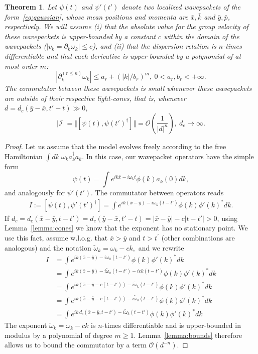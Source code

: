 \documentclass[notitlepage, prx, preprint, amsmath,superscriptaddress,amssymb]{revtex4-1}
\newtheorem{theorem}{Theorem}[section]
\begin{document}
\begin{theorem}
\label{th:free-causality}
Let $\psi(t)$ and $\psi'(t')$ denote two localized wavepackets of the form\ \eqref{eq:gaussian}, whose mean positions and momenta are $\bar x,\bar k$ and $\bar y,\bar p$, respectively. We will assume (i) that the  absolute value for the group velocity of these wavepackets is upper-bounded by a constant $c$ within the domain of the wavepackets ($\vert  v_k = \partial_k \omega_k \vert  \leq c$), and (ii) that the dispersion relation is $n$-times differentiable and that each derivative is upper-bounded by a polynomial of at most order $m$:
\begin{equation}
|\partial^{(r\leq n)}_k\omega_k|\leq a_r + (|k|/b_r)^m,~0< a_r,b_r<+\infty.
\end{equation}
The commutator between these wavepackets is small whenever these wavepackets are outside of their respective light-cones, that is, whenever $d=d_c(\bar y-\bar x,t'-t)\gg 0$, 
\begin{equation}
|\mathcal{I}|=\Vert[\psi(t),\psi(t')^\dagger]\Vert =
\mathcal{O}\left(\frac{1}{|d|^n}\right),~d_c\to\infty.
\end{equation}
\end{theorem}

\begin{proof}
Let us assume that the model evolves freely according to the free Hamiltonian
$\int d k \; \omega_k a_k^\dagger a_k$.
In this case, our wavepacket operators have the simple form
\begin{equation}
\psi(t) = \int  e^{ik\bar x-i\omega_kt} \phi(k) a_k(0) dk,
\end{equation}
and analogously for $\psi'(t')$. The commutator between operators reads
\begin{align}
I:=[\psi(t),\psi'(t')^\dagger] =
\int e^{ik(\bar x-\bar y)-i\omega_k(t-t')} \phi(k)\phi'(k)^*dk.
\label{eq:free-com}
\end{align}
If $d_c= d_c(\bar x-\bar y,t-t')  = d_c(\bar y-\bar x,t'-t) = |\bar x-\bar y| -c|t-t'|   > 0$, using Lemma\ \ref{lemma:cones} we know that the exponent has no stationary point. We use this fact, assume w.l.o.g.  that $\bar x>\bar y$ and $t>t^\prime$ (other combinations are analogous) and the notation  $\tilde\omega_k = \omega_k -c k,$ and we rewrite
\begin{align*}
I&= \int  e^{ik(\bar x-\bar y)-i\omega_k(t-t')}  \phi(k)\phi'(k)^*dk\\
&= \int  e^{ik(\bar x-\bar y)-i\tilde\omega_k(t-t') - ick(t-t')}  \phi(k)\phi'(k)^*dk\\
&= \int  e^{ik(\bar x-\bar y-c(t-t'))-i\tilde\omega_k(t-t')}  \phi(k)\phi'(k)^*dk\\
&= \int  e^{ik(\bar x-\bar y-c(t-t'))-i\tilde\omega_k(t-t')}  \phi(k)\phi'(k)^*dk\\
&=\int e^{ik\,  d_c(\bar x-\bar y, t-t')-i\tilde\omega_k(t-t')} \phi(k)\phi'(k)^*dk
\end{align*}
The exponent $\tilde\omega_k = \omega_k -c k$ is $n$-times differentiable and is upper-bounded in modulus by a polynomial of degree $m\geq 1$. Lemma\ \ref{lemma:bounds} therefore allows us to bound the commutator by a term $\mathcal{O}(d^{-n})$.
\end{proof}
\end{document}
